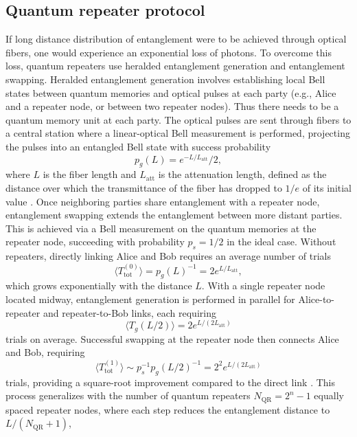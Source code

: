 \subsection{Quantum repeater protocol}
If long distance distribution of entanglement were to be achieved through optical fibers, one would experience an exponential loss of photons. To overcome this loss, quantum repeaters use heralded entanglement generation and entanglement swapping. Heralded entanglement generation involves establishing local Bell states between quantum memories and optical pulses at each party (e.g., Alice and a repeater node, or between two repeater nodes). Thus there needs to be a quantum memory unit at each party. The optical pulses are sent through fibers to a central station where a linear-optical Bell measurement is performed, projecting the pulses into an entangled Bell state with success probability 
 \begin{equation}
    p_g(L) = e^{-L/L_{\text{att}}}/2,
 \end{equation}
 where $L$ is the fiber length and $L_{\text{att}}$ is the attenuation length, defined as the distance over which the transmittance of the fiber has dropped to $1/e$ of its initial value \cite{Azuma:2023}. Once neighboring parties share entanglement with a repeater node, entanglement swapping extends the entanglement between more distant parties. This is achieved via a Bell measurement on the quantum memories at the repeater node, succeeding with probability $p_s = 1/2$ in the ideal case. Without repeaters, directly linking Alice and Bob requires an average number of trials 
 \begin{equation}
    \langle T^{(0)}_{\text{tot}} \rangle = p_g(L)^{-1} = 2e^{L/L_{\text{att}}},
 \end{equation}
 which grows exponentially with the distance $L$. With a single repeater node located midway, entanglement generation is performed in parallel for Alice-to-repeater and repeater-to-Bob links,
 each requiring 
 \begin{equation}
    \langle T_g(L/2) \rangle = 2e^{L/(2L_{\text{att}})}
 \end{equation}
 trials on average. Successful swapping at the repeater node then connects Alice and Bob, requiring 
 \begin{equation}
    \langle T^{(1)}_{\text{tot}} \rangle \sim p_s^{-1} p_g(L/2)^{-1} = 2^2 e^{L/(2L_{\text{att}})}
 \end{equation}
trials, providing a square-root improvement compared to the direct link \cite{Azuma:2023}. This process generalizes with the number of quantum repeaters $N_{\text{QR}} = 2^n - 1$ equally spaced repeater nodes, where each step reduces the entanglement distance to $L/(N_{\text{QR}} + 1)$,
